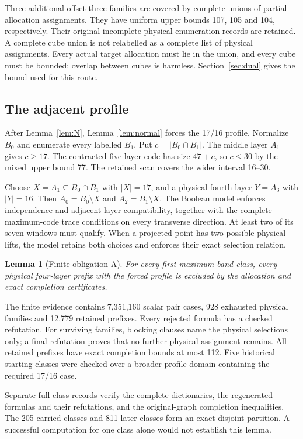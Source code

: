 \documentclass[11pt]{article}
\newtheorem{lemma}[theorem]{Lemma}
\theoremstyle{definition}
\begin{document}
Three additional offset-three families are covered by complete unions of
partial allocation assignments. They have uniform upper bounds 107, 105
and 104, respectively. Their original incomplete physical-enumeration
records are retained. A complete cube union is not relabelled as a
complete list of physical assignments. Every actual target allocation
must lie in the union, and every cube must be bounded; overlap between
cubes is harmless. Section~\ref{sec:dual} gives the bound used for this
route.

\subsection{The adjacent profile}
After Lemma~\ref{lem:N}, Lemma~\ref{lem:normal} forces the 17/16 profile.
Normalize $B_0$ and enumerate every labelled $B_1$. Put
$c=|B_0\cap B_1|$. The middle layer $A_1$ gives $c\geq17$.
The contracted five-layer code has size $47+c$, so $c\leq30$ by the
mixed upper bound 77. The retained scan covers the wider interval 16--30.

Choose $X=A_1\subseteq B_0\cap B_1$ with $|X|=17$, and a physical
fourth layer $Y=A_3$ with $|Y|=16$. Then
$A_0=B_0\setminus X$ and $A_2=B_1\setminus X$.
The Boolean model enforces independence and adjacent-layer compatibility,
together with the complete maximum-code trace conditions on every
transverse direction. At least two of its seven windows must qualify.
When a projected point has two possible physical lifts, the model retains
both choices and enforces their exact selection relation.

\begin{lemma}[Finite obligation A]\label{lem:A}
For every first maximum-band class, every physical four-layer prefix
with the forced profile is excluded by the allocation and exact
completion certificates.
\end{lemma}
The finite evidence contains 7,351,160 scalar pair cases, 928 exhausted
physical families and 12,779 retained prefixes. Every rejected formula
has a checked refutation. For surviving families, blocking clauses name
the physical selections only; a final refutation proves that no further
physical assignment remains. All retained prefixes have exact completion
bounds at most 112. Five historical starting classes were checked over
a broader profile domain containing the required 17/16 case.

Separate full-class records verify the complete dictionaries, the
regenerated formulas and their refutations, and the original-graph
completion inequalities. The 205 carried classes and 811 later classes
form an exact disjoint partition. A successful computation for one class
alone would not establish this lemma.
\end{document}
